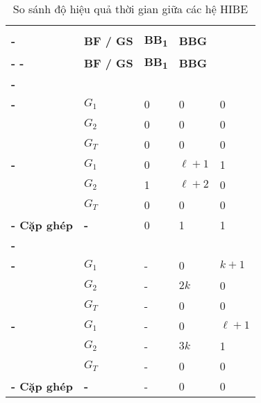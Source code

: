 \baselineskip
\begin{longtabu}{| >{\bfseries\centering}p{2.5cm} | >{\bfseries\centering}p{1cm} | X[c] X[c] X[c] |}
	\captionsetup{font=normalsize}
	\caption{So sánh độ hiệu quả thời gian giữa các hệ HIBE}\label{table:hibe_time_comparison} \\
	\tabucline[4pt]-
	 		&
	\bfseries BF / GS		 		&
	\bfseries BB\textsubscript{1} 	&
	\bfseries BBG 					\\
	\tabucline[2pt]-
	\endfirsthead
	\tabucline[4pt]-
	 		&
	\bfseries BF / GS		 		&
	\bfseries BB\textsubscript{1} 	&
	\bfseries BBG 					\\
	\tabucline[2pt]-
	\endhead
	 \\
	\tabucline[1pt]-
	& $G_1$ 			& 	0 	& 	0 			& 	0 	\\
	& $G_2$ 			& 	0 	& 	0 			& 	0 	\\
	& $G_T$ 			& 	0 	& 	0 			& 	0 	\\
	\tabucline[1pt]-
	& $G_1$ 			& 	0 	& 	$\ell + 1$ 	& 	1 	\\
	& $G_2$ 			& 	1 	& 	$\ell + 2$ 	& 	0 	\\
	& $G_T$ 			& 	0 	& 	0 			& 	0 	\\
	\tabucline[1pt]-
	Cặp ghép & - 		& 	0 	& 	1 			& 	1 	\\
	\tabucline[2pt]-
	 \\
	\tabucline[1pt]-
	& $G_1$ 			& 	- 	& 	0 		& 	$k + 1$ 	\\
	& $G_2$ 			& 	- 	& 	$2k$ 	& 	0 			\\
	& $G_T$ 			& 	- 	& 	0 		& 	0 			\\
	\tabucline[1pt]-
	& $G_1$ 			& 	- 	& 	0 		& 	$\ell + 1$ 	\\
	& $G_2$ 			& 	- 	& 	$3k$ 	& 	1 			\\
	& $G_T$ 			& 	- 	& 	0 		& 	0 			\\
	\tabucline[1pt]-
	Cặp ghép & - 		& 	- 	& 	0 		& 	0 			\\

\end{longtabu}
